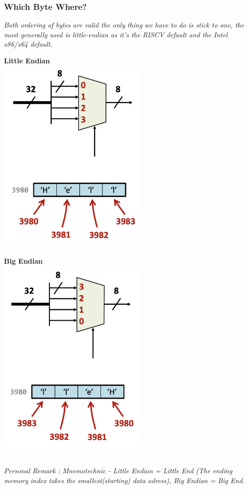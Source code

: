 \subsubsection{Which Byte Where?}
\textit{Both ordering of bytes are valid the only thing we have to do is stick to one, the most generally used is little-endian as it's the RISCV default and the Intel x86/x64 default.} \\ \vspace*{5px}
\begin{minipage}[htp]{0.45\textwidth}
    \begin{center}
        \textbf{Little Endian} \\ \vspace*{5px}
        \includegraphics[width=0.55\textwidth]{chapters/chapter1c/images/bytes.png}
    \end{center}   
\end{minipage}
\hfill
\vline
\hfill
\begin{minipage}[htp]{0.45\textwidth}
    \begin{center}
        \textbf{Big Endian} \\ \vspace*{5px}
        \includegraphics[width=0.55\textwidth]{chapters/chapter1c/images/bytes2.png}
\end{center}
\end{minipage} \\ \vspace*{5px}
\textit{Personal Remark : Mnemotechnic - Little Endian = Little End (The ending memory index takes the smallest(starting) data adress), Big Endian = Big End.}